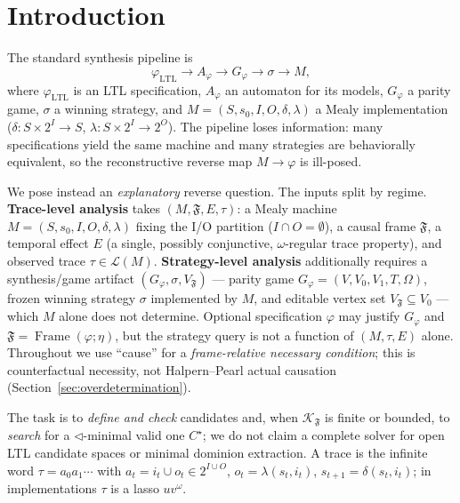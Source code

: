 \documentclass[11pt]{article}
\theoremstyle{remark}
\newcommand{\LTL}{\mathrm{LTL}}
\newcommand{\Lang}{\mathcal{L}}
\newcommand{\Frame}{\mathfrak{F}}
\newcommand{\Design}{\eta}
\begin{document}
\tableofcontents

\section{Introduction}
\label{sec:intro}

The standard synthesis pipeline is
\[
  \varphi_{\LTL}\longrightarrow A_{\varphi}\longrightarrow G_{\varphi}
  \longrightarrow \sigma \longrightarrow M ,
\]
where \(\varphi_{\LTL}\) is an LTL specification, \(A_{\varphi}\) an automaton for
its models, \(G_{\varphi}\) a parity game, \(\sigma\) a winning strategy, and
\(M=(S,s_0,I,O,\delta,\lambda)\) a Mealy implementation (\(\delta:S\times
2^I\to S\), \(\lambda:S\times 2^I\to 2^O\)). The pipeline loses information: many
specifications yield the same machine and many strategies are behaviorally
equivalent, so the reconstructive reverse map \(M\to\varphi\) is ill-posed.

We pose instead an \emph{explanatory} reverse question. The inputs split by
regime. \textbf{Trace-level analysis} takes \((M,\Frame,E,\tau)\): a Mealy
machine \(M=(S,s_0,I,O,\delta,\lambda)\) fixing the I/O partition (\(I\cap
O=\emptyset\)), a causal frame \(\Frame\), a temporal effect \(E\) (a single,
possibly conjunctive, \(\omega\)-regular trace property), and observed trace
\(\tau\in\Lang(M)\). \textbf{Strategy-level analysis} additionally requires a
synthesis/game artifact \((G_\varphi,\sigma,V_{\Frame})\) --- parity game
\(G_\varphi=(V,V_0,V_1,T,\Omega)\), frozen winning strategy \(\sigma\) implemented
by \(M\), and editable vertex set \(V_{\Frame}\subseteq V_0\) --- which \(M\) alone
does not determine. Optional specification \(\varphi\) may justify \(G_\varphi\) and
\(\Frame=\operatorname{Frame}(\varphi;\Design)\), but the strategy query is not a
function of \((M,\tau,E)\) alone. Throughout we use ``cause'' for a
\emph{frame-relative necessary condition}; this is counterfactual necessity, not
Halpern--Pearl actual causation (Section~\ref{sec:overdetermination}).

The task is to \emph{define and check} candidates and, when
\(\mathcal{K}_{\Frame}\) is finite or bounded, to \emph{search} for a
\(\triangleleft\)-minimal valid one \(C^\star\); we do not claim a complete solver
for open LTL candidate spaces or minimal dominion extraction. A trace is the infinite word
\(\tau=a_0a_1\cdots\) with \(a_t=i_t\cup o_t\in 2^{I\cup O}\),
\(o_t=\lambda(s_t,i_t)\), \(s_{t+1}=\delta(s_t,i_t)\); in implementations \(\tau\)
is a lasso \(uv^\omega\).
\end{document}
